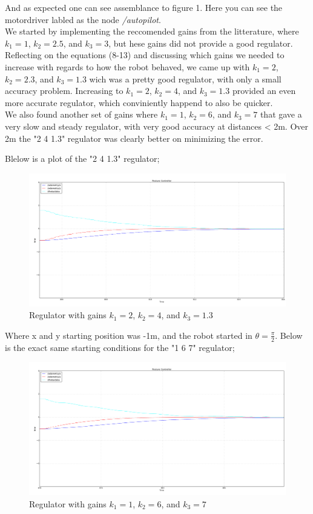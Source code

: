 \documentclass[a4paper,10pt]{article}
\begin{document}
		And as expected one can see assemblance to figure 1. Here you can see the motordriver labled as the node \textit{/autopilot}. \\


		We started by implementing the reccomended gains from the litterature, where $k_{1}=1$, $k_{2}=2.5$, and $k_{3}=3$, but hese gains did not provide a good regulator.
		Reflecting on the equations (8-13) and discussing which gains we needed to increase with regards to how the robot behaved, we came up with  $k_{1}=2$, $k_{2}=2.3$, and $k_{3}=1.3$
		wich was a pretty good regulator, with only a small accuracy problem. Increasing to $k_{1}=2$, $k_{2}=4$, and $k_{3}=1.3$ provided an even more accurate regulator, which
		conviniently happend to also be quicker.\\
		We also found another set of gains where $k_{1}=1$, $k_{2}=6$, and $k_{3}=7$ that gave a very slow and steady regulator, with very good accuracy at distances < 2m. Over 2m the
		"2 4 1.3" regulator was clearly better on minimizing the error.
		
		Blelow is a plot of the "2 4 1.3" regulator;
		\begin{figure}[H]
		\raggedleft
		\includegraphics[width=1.1\textwidth]{rover2_rqt_plot94_2413.png}
		\caption{Regulator with gains $k_{1}=2$, $k_{2}=4$, and $k_{3}=1.3$}	
 		\label{fig:33}
		\end{figure}				 
	
		Where x and y starting position was -1m, and the robot started in $\theta=\frac{\pi}{2}$. Below is the exact same starting conditions for the "1 6 7" regulator;

		\begin{figure}[H]
		\centering
		\includegraphics[width=1.1\textwidth]{rover2_rqt_plot94_167.png}
		\caption{Regulator with gains $k_{1}=1$, $k_{2}=6$, and $k_{3}=7$}
 		\label{fig:333}
		\end{figure}
\end{document}
